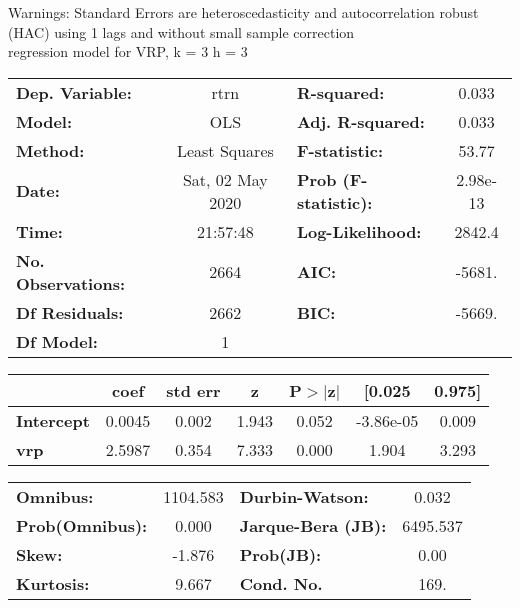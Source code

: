 Warnings: \newline
 [1] Standard Errors are heteroscedasticity and autocorrelation robust (HAC) using 1 lags and without small sample correction\\ 

regression model for VRP, k = 3 h = 3\begin{center}
\begin{tabular}{lclc}
\toprule
\textbf{Dep. Variable:}    &       rtrn       & \textbf{  R-squared:         } &     0.033   \\
\textbf{Model:}            &       OLS        & \textbf{  Adj. R-squared:    } &     0.033   \\
\textbf{Method:}           &  Least Squares   & \textbf{  F-statistic:       } &     53.77   \\
\textbf{Date:}             & Sat, 02 May 2020 & \textbf{  Prob (F-statistic):} &  2.98e-13   \\
\textbf{Time:}             &     21:57:48     & \textbf{  Log-Likelihood:    } &    2842.4   \\
\textbf{No. Observations:} &        2664      & \textbf{  AIC:               } &    -5681.   \\
\textbf{Df Residuals:}     &        2662      & \textbf{  BIC:               } &    -5669.   \\
\textbf{Df Model:}         &           1      & \textbf{                     } &             \\
\bottomrule
\end{tabular}
\begin{tabular}{lcccccc}
                   & \textbf{coef} & \textbf{std err} & \textbf{z} & \textbf{P$> |$z$|$} & \textbf{[0.025} & \textbf{0.975]}  \\
\midrule
\textbf{Intercept} &       0.0045  &        0.002     &     1.943  &         0.052        &    -3.86e-05    &        0.009     \\
\textbf{vrp}       &       2.5987  &        0.354     &     7.333  &         0.000        &        1.904    &        3.293     \\
\bottomrule
\end{tabular}
\begin{tabular}{lclc}
\textbf{Omnibus:}       & 1104.583 & \textbf{  Durbin-Watson:     } &    0.032  \\
\textbf{Prob(Omnibus):} &   0.000  & \textbf{  Jarque-Bera (JB):  } & 6495.537  \\
\textbf{Skew:}          &  -1.876  & \textbf{  Prob(JB):          } &     0.00  \\
\textbf{Kurtosis:}      &   9.667  & \textbf{  Cond. No.          } &     169.  \\
\bottomrule
\end{tabular}
\end{center}

